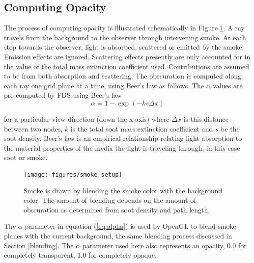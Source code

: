 \documentclass[11pt,twoside]{book}
\newcommand{\figoptions}{htp}
\begin{document}


%
%

\subsection{Computing Opacity}
The process of computing opacity is illustrated schematically in Figure \ref{figsmokesetup}.
A ray travels from the background to the observer through intervening smoke.
At each step towards the observer, light is absorbed, scattered or emitted by the smoke.  Emission effects are ignored.  Scattering effects presently are only accounted for in the value of the total mass extinction coefficient used.  Contributions are assumed to be from both absorption and scattering.
The obscuration is computed along each ray one grid plane at a time, using Beer's law as follows.  The $\alpha$ values are pre-computed by FDS using Beer's
law~\cite{Siegel:2001}
\begin{equation}
\alpha=1-\exp(-ks\Delta x) \label{eq:alpha}
\end{equation}

\noindent for a particular view direction (down the x axis) where $\Delta x$
is this distance between two nodes, $k$ is the total soot mass
extinction coefficient and $s$ be the soot density. Beer's law is
an empirical relationship relating light absorption to the
material properties of the media the light is traveling through,
in this case soot or smoke.

\begin{figure}[\figoptions]
\begin{center}
\texttt{[image: figures/smoke\_setup]}
\end{center}
\caption {Smoke is drawn by blending the smoke color with the
background color.  The amount of blending depends on the amount of
obscuration as determined from soot density and path length.}
\label{figsmokesetup}
\end{figure}

The $\alpha$ parameter in equation (\ref{eq:alpha}) is used by OpenGL to blend smoke planes with the current background, the same blending process discussed in Section \ref{blending}.  The $\alpha$ parameter used here also represents an opacity, 0.0 for completely transparent, 1.0 for completely opaque.
\end{document}
